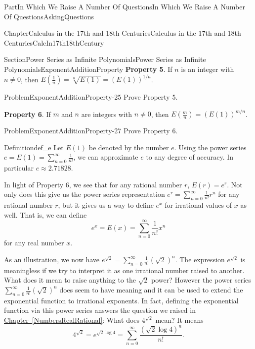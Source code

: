 \documentclass[oneside,10pt,]{book}
\newcommand{\xreffont}{\relax}
\newcommand{\terminology}[1]{\textbf{#1}}
\numberwithin{equation}{part}
\begin{document}
\begin{partptx}{Part}{In Which We Raise A Number Of Questions}{}{In Which We Raise A Number Of Questions}{}{}{AskingQuestions}
\begin{chapterptx}{Chapter}{Calculus in the 17th and 18th Centuries}{}{Calculus in the 17th and 18th Centuries}{}{}{CalcIn17th18thCentury}
\begin{sectionptx}{Section}{Power Series as Infinite Polynomials}{}{Power Series as Infinite Polynomials}{}{}{ExponentAdditionProperty}
\terminology{Property 5}. If \(n\) is an integer with \(n\neq 0\), then \(E(\frac{1}{n})=\sqrt[n]{E(1)}=\left(E(1)\right)^{1/n}\).%
\begin{problem}{Problem}{}{ExponentAdditionProperty-25}%
Prove Property 5.%
\end{problem}
\terminology{Property 6}. If \(m\) and \(n\) are integers with \(n\neq 0\), then \(E\left(\frac{m}{n}\right)=\left(E(1)\right)^{m/n}\).%
\begin{problem}{Problem}{}{ExponentAdditionProperty-27}%
Prove Property 6.%
\end{problem}
\begin{definition}{Definition}{}{def_e}%
%
%
Let \(E(1)\) be denoted by the number \(e\). Using the power series \(e=E(1)=\sum_{n=0}^\infty\frac{1}{n!}\), we can approximate \(e\) to any degree of accuracy. In particular \(e\approx 2.71828\).%
\end{definition}
In light of Property 6, we see that for any rational number \(r\), \(E(r)=e^r\).  Not only does this give us the power series representation \(e^r=\sum_{n=0}^\infty\frac{1}{n!}r^n\) for any rational number \(r\), but it gives us a way to define \(e^x\) for irrational values of \(x\) as well.  That is, we can define%
\begin{equation*}
e^x=E(x)=\sum_{n=0}^\infty\frac{1}{n!}x^n
\end{equation*}
for any real number \(x\).%
\par
As an illustration, we now have \(e^{\sqrt{2}}=\sum_{n=0}^\infty\frac{1}{n!}\left(\sqrt{2}\right)^n\). The expression \(e^{\sqrt{2}}\) is meaningless if we try to interpret it as one irrational number raised to another. What does it mean to raise anything to the \(\sqrt{2}\) power?  However the power series \(\sum_{n=0}^\infty\frac{1}{n!}\left(\sqrt{2}\right)^n\) does seem to have meaning and it can be used to extend the exponential function to irrational exponents.  In fact, defining the exponential function via this power series answers the question we raised in \hyperref[NumbersRealRational]{Chapter~{\xreffont\ref{NumbersRealRational}}}: What does \(4^{\sqrt{2}}\) mean? It means%
\begin{equation*}
4^{\sqrt{2}} = e^{\sqrt{2}\log 4} =
\sum_{n=0}^\infty\frac{(\sqrt{2}\log 4)^n}{n!}  \text{.}
\end{equation*}
%
\par

\end{sectionptx}
\end{chapterptx}
\end{partptx}
\end{document}
